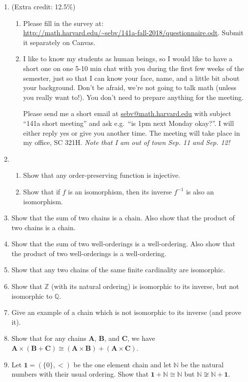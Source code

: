 \documentclass{amsart}
\theoremstyle{definition}
\newcommand{\bA}{\mathbf{A}}
\newcommand{\bB}{\mathbf{B}}
\newcommand{\bC}{\mathbf{C}}
\begin{document}
\begin{enumerate}
\item (Extra credit: 12.5\%) \begin{enumerate}
\item Please fill in the survey at: \\
  \url{http://math.harvard.edu/~sebv/141a-fall-2018/questionnaire.odt}. Submit it separately on Canvas.
\item I like to know my students as human beings, so I would like to have a short one on one 5-10 min chat with you during the first few weeks of the semester, just so that I can know your face, name, and a little bit about your background. Don't be afraid, we're not going to talk math (unless you really want to!). You don't need to prepare anything for the meeting.

  Please send me a short email at \url{sebv@math.harvard.edu} with subject ``141a short meeting'' and ask e.g.\ ``is 1pm next Monday okay?''. I will either reply yes or give you another time. The meeting will take place in my office, SC 321H. \emph{Note that I am out of town Sep. 11 and Sep. 12!}
\end{enumerate}
\item \begin{enumerate}
\item Show that any order-preserving function is injective.
\item Show that if $f$ is an isomorphism, then its inverse $f^{-1}$ is also an isomorphism.
\end{enumerate}
\item Show that the sum of two chains is a chain. Also show that the product of two chains is a chain.
\item Show that the sum of two well-orderings is a well-ordering. Also show that the product of two well-orderings is a well-ordering.
\item Show that any two chains of the same finite cardinality are isomorphic.
\item Show that $\mathbb{Z}$ (with its natural ordering) is isomorphic to its inverse, but not isomorphic to $\mathbb{Q}$.
\item Give an example of a chain which is not isomorphic to its inverse (and prove it).
\item Show that for any chains $\bA$, $\bB$, and $\bC$, we have $\bA \times (\bB + \bC) \cong (\bA \times \bB) + (\bA \times \bC)$.
\item Let $\mathbf{1} = (\{0\}, <)$ be the one element chain and let $\mathbb{N}$ be the natural numbers with their usual ordering. Show that $\mathbf{1} + \mathbb{N} \cong \mathbb{N}$ but $\mathbb{N} \not \cong \mathbb{N} + \mathbf{1}$.
\end{enumerate}



\end{document}
